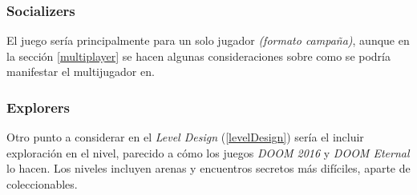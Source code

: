         \subsubsection{Socializers}
            El juego sería principalmente para un solo jugador \textit{(formato campaña)}, aunque en la sección \ref{multiplayer} se hacen algunas consideraciones sobre como se podría manifestar el multijugador en\TWD.
        \subsubsection{Explorers}
            Otro punto a considerar en el \textit{Level Design} (\ref{levelDesign}) sería el incluir exploración en el nivel, parecido a cómo los juegos \textit{DOOM 2016}\cite{doom2016} y \textit{DOOM Eternal}\cite{doomEternal2020} lo hacen. Los niveles incluyen arenas y encuentros secretos más difíciles, aparte de coleccionables.

\newpage

